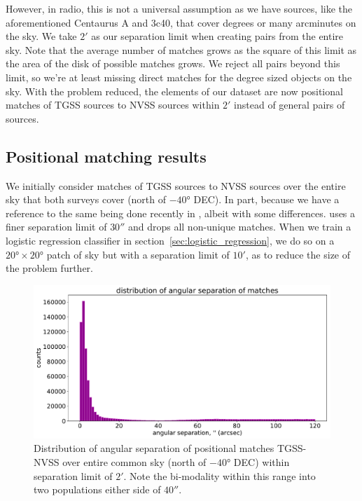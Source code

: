 \documentclass[12pt,a4paper]{article}
\begin{document}
However, in radio, this is not a universal assumption as we have sources, like the aforementioned Centaurus A and 3c40, that cover degrees or many arcminutes on the sky. We take $\ang{;2;}$ as our separation limit when creating pairs from the entire sky. Note that the average number of matches grows as the square of this limit as the area of the disk of possible matches grows. We reject all pairs beyond this limit, so we're at least missing direct matches for the degree sized objects on the sky. With the problem reduced, the elements of our dataset are now positional matches of TGSS sources to NVSS sources within $\ang{;2;}$ instead of general pairs of sources.

\subsection{Positional matching results}
\label{sec:posmatch}

We initially consider matches of TGSS sources to NVSS sources over the entire sky that both surveys cover (north of $-\ang{40}$ DEC). In part, because we have a reference to the same being done recently in \citet{posmatchpaper}, albeit with some differences. \citet{posmatchpaper} uses a finer separation limit of $\ang{;;30}$ and drops all non-unique matches. When we train a logistic regression classifier in section~\ref{sec:logistic_regression}, we do so on a $\ang{20}\times\ang{20}$ patch of sky but with a separation limit of $\ang{;10;}$, as to reduce the size of the problem further.

\begin{figure}[H]
    \centering
    \includegraphics[width=\textwidth]{pics/hist_angle.pdf}
    \caption{Distribution of angular separation of positional matches TGSS-NVSS over entire common sky (north of $-\ang{40}$ DEC) within separation limit of $\ang{;2;}$. Note the bi-modality within this range into two populations either side of $\ang{;;40}$.}
    \label{fig:hist_angle}
\end{figure}
\end{document}
